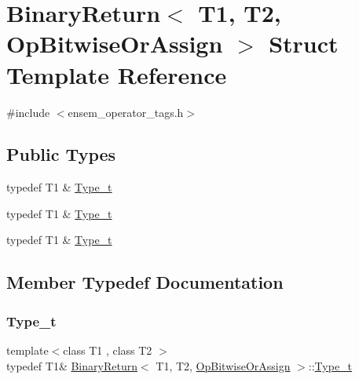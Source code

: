 \hypertarget{structBinaryReturn_3_01T1_00_01T2_00_01OpBitwiseOrAssign_01_4}{}\section{Binary\+Return$<$ T1, T2, Op\+Bitwise\+Or\+Assign $>$ Struct Template Reference}
\label{structBinaryReturn_3_01T1_00_01T2_00_01OpBitwiseOrAssign_01_4}


{\ttfamily \#include $<$ensem\+\_\+operator\+\_\+tags.\+h$>$}

\subsection*{Public Types}
\begin{DoxyCompactItemize}
\item 
typedef T1 \& \mbox{\hyperlink{structBinaryReturn_3_01T1_00_01T2_00_01OpBitwiseOrAssign_01_4_a256f1f50cdbaf032fbed109888ad5bfc}{Type\+\_\+t}}
\item 
typedef T1 \& \mbox{\hyperlink{structBinaryReturn_3_01T1_00_01T2_00_01OpBitwiseOrAssign_01_4_a256f1f50cdbaf032fbed109888ad5bfc}{Type\+\_\+t}}
\item 
typedef T1 \& \mbox{\hyperlink{structBinaryReturn_3_01T1_00_01T2_00_01OpBitwiseOrAssign_01_4_a256f1f50cdbaf032fbed109888ad5bfc}{Type\+\_\+t}}
\end{DoxyCompactItemize}


\subsection{Member Typedef Documentation}
\mbox{\label{structBinaryReturn_3_01T1_00_01T2_00_01OpBitwiseOrAssign_01_4_a256f1f50cdbaf032fbed109888ad5bfc}} 
\subsubsection{\texorpdfstring{Type\_t}{Type\_t}\hspace{0.1cm}{\footnotesize\ttfamily [1/3]}}
{\footnotesize\ttfamily template$<$class T1 , class T2 $>$ \\
typedef T1\& \mbox{\hyperlink{structBinaryReturn}{Binary\+Return}}$<$ T1, T2, \mbox{\hyperlink{structOpBitwiseOrAssign}{Op\+Bitwise\+Or\+Assign}} $>$\+::\mbox{\hyperlink{structBinaryReturn_3_01T1_00_01T2_00_01OpBitwiseOrAssign_01_4_a256f1f50cdbaf032fbed109888ad5bfc}{Type\+\_\+t}}}

